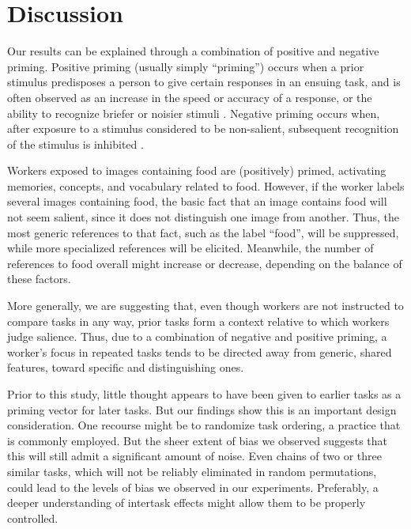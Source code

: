 \documentclass{sigchi}
\begin{document}
\section{Discussion}
Our results can be 
explained through a combination of positive and negative priming.
Positive priming (usually simply ``priming'') occurs when a prior stimulus 
predisposes a person to give certain responses in an ensuing task, and
is often observed as an increase in the speed or accuracy of a response, or
the ability to recognize briefer or noisier stimuli 
\cite{BJOP1796,BJOP1826,Huber2008324}.
Negative priming occurs when, after exposure to a stimulus 
considered to be non-salient, subsequent recognition of the stimulus is 
inhibited \cite{mayr2007negative}.

Workers exposed to images containing food are (positively) primed, 
activating memories, concepts, and vocabulary related to food.  
However, if the worker labels several images containing food, the basic 
fact that an image contains food will not seem salient, since it 
does not distinguish one image from another.  Thus, the most 
generic references to that fact, such as the label ``food'', 
will be suppressed, while more specialized references will be elicited.  
Meanwhile, the number of references to food overall might increase or 
decrease, depending on the balance of these factors.  

More generally, we are suggesting that, even though workers are not 
instructed to compare tasks in any way, prior tasks form a 
context relative to which workers judge salience.  Thus, due to a combination 
of negative and positive priming, a worker's focus 
in repeated tasks tends to be directed away from generic, shared features, 
toward specific and distinguishing ones.

Prior to this study, little thought appears to have been given to
earlier tasks as a priming vector for later tasks.
But our findings show this is an important design consideration.  
One recourse might be to randomize task ordering, a practice that is 
commonly employed.  But the sheer extent of bias we observed suggests that 
this will still admit a significant amount of noise.  
Even chains of two or three similar tasks, which
will not be reliably eliminated in random permutations, could lead
to the levels of bias we observed in our experiments.
Preferably, a deeper understanding of intertask effects might allow them
to be properly controlled.
\end{document}

